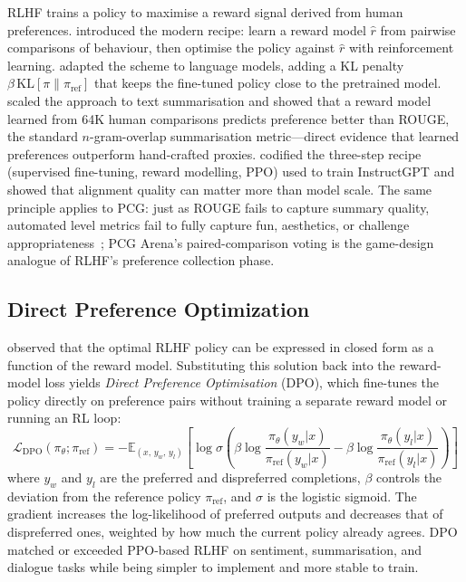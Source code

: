 \documentclass[shortabstract, mgr, english]{iithesis}
\begin{document}
RLHF trains a policy to maximise a reward signal derived from human
preferences.
\citet{christiano2017deep} introduced the modern recipe: learn a reward model
$\hat{r}$ from pairwise comparisons of behaviour, then optimise the policy
against $\hat{r}$ with reinforcement learning. \citet{ziegler2019fine} adapted
the scheme to language models, adding a KL penalty
$\beta\,\mathrm{KL}[\pi \| \pi_{\mathrm{ref}}]$ that keeps the fine-tuned
policy close to the pretrained model. \citet{stiennon2020learning} scaled the
approach to text summarisation and showed that a reward model learned from 64K
human comparisons predicts preference better than ROUGE, the standard
$n$-gram-overlap summarisation metric---direct evidence that learned
preferences outperform hand-crafted proxies. \citet{ouyang2022training}
codified the three-step recipe (supervised fine-tuning, reward modelling, PPO)
used to train InstructGPT and showed that alignment quality can matter more
than model scale. The same principle applies to PCG: just as ROUGE fails to
capture summary quality, automated level metrics fail to fully capture fun,
aesthetics, or challenge appropriateness~\citep{marino2015empirical}; PCG
Arena's paired-comparison voting is the game-design analogue of RLHF's
preference collection phase.
\subsection{Direct Preference Optimization}
\label{subsec:bg-dpo}

\citet{rafailov2023direct} observed that the optimal RLHF policy can be expressed
in closed form as a function of the reward model. Substituting this solution back
into the reward-model loss yields \emph{Direct Preference Optimisation} (DPO),
which fine-tunes the policy directly on preference pairs without training a separate
reward model or running an RL loop:
%
\begin{equation}
\label{eq:dpo}
\mathcal{L}_{\text{DPO}}(\pi_\theta; \pi_{\text{ref}}) =
  -\mathbb{E}_{(x,\,y_w,\,y_l)}\!\left[
    \log\sigma\!\left(
      \beta\log\frac{\pi_\theta(y_w|x)}{\pi_{\text{ref}}(y_w|x)}
      - \beta\log\frac{\pi_\theta(y_l|x)}{\pi_{\text{ref}}(y_l|x)}
    \right)
  \right]
\end{equation}
%
where $y_w$ and $y_l$ are the preferred and dispreferred completions, $\beta$
controls the deviation from the reference policy $\pi_{\text{ref}}$, and
$\sigma$ is the logistic sigmoid. The gradient increases the
log-likelihood of preferred outputs and decreases that of dispreferred ones,
weighted by how much the current policy already agrees. DPO matched or exceeded
PPO-based RLHF on sentiment, summarisation, and dialogue tasks while being
simpler to implement and more stable to train.
\end{document}
